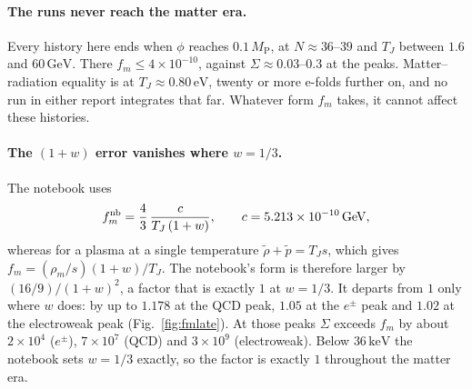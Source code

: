 \documentclass[11pt,a4paper]{article}
\newcommand{\MP}{M_{\mathrm{P}}}
\newcommand{\TJ}{T_{J}}
\newcommand{\GeV}{\,\mathrm{GeV}}
\begin{document}
\paragraph{The runs never reach the matter era.} Every history here ends when $\phi$ reaches
$0.1\,\MP$, at $N \approx 36$--$39$ and $\TJ$ between $1.6$ and $60\GeV$. There $f_m \le
4\times10^{-10}$, against $\Sigma \approx 0.03$--$0.3$ at the peaks. Matter--radiation
equality is at $\TJ \approx 0.80\,\mathrm{eV}$, twenty or more e-folds further on, and no run in
either report integrates that far. Whatever form $f_m$ takes, it cannot affect these histories.

\paragraph{The $(1+w)$ error vanishes where $w = 1/3$.} The notebook uses
\begin{equation}
  f_m^{\rm nb} = \frac{4}{3}\,\frac{c}{\TJ\,(1+w)}, \qquad c = 5.213\times10^{-10}\GeV,
\end{equation}
whereas for a plasma at a single temperature $\tilde\rho + \tilde p = \TJ s$, which gives
$f_m = (\rho_m/s)(1+w)/\TJ$. The notebook's form is therefore larger by $(16/9)/(1+w)^2$, a
factor that is exactly $1$ at $w = 1/3$. It departs from $1$ only where $w$ does: by up to
$1.178$ at the QCD peak, $1.05$ at the $e^\pm$ peak and $1.02$ at the electroweak peak
(Fig.~\ref{fig:fmlate}). At those peaks $\Sigma$ exceeds $f_m$ by about $2\times10^4$ ($e^\pm$), $7\times10^7$ (QCD) and
$3\times10^9$ (electroweak).
Below $36\,\mathrm{keV}$ the notebook sets $w = 1/3$ exactly, so the factor is exactly $1$
throughout the matter era.
\end{document}
